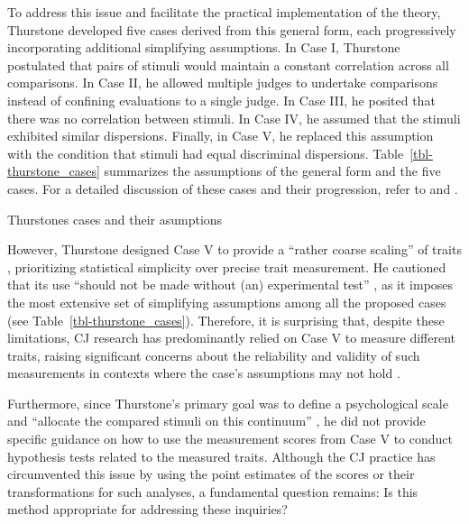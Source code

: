 \documentclass[
  authoryear,
  review,
  1p]{elsarticle}
\begin{document}
To address this issue and facilitate the practical implementation of the
theory, Thurstone developed five cases derived from this general form,
each progressively incorporating additional simplifying assumptions. In
Case I, Thurstone postulated that pairs of stimuli would maintain a
constant correlation across all comparisons. In Case II, he allowed
multiple judges to undertake comparisons instead of confining
evaluations to a single judge. In Case III, he posited that there was no
correlation between stimuli. In Case IV, he assumed that the stimuli
exhibited similar dispersions. Finally, in Case V, he replaced this
assumption with the condition that stimuli had equal discriminal
dispersions. Table~\ref{tbl-thurstone_cases} summarizes the assumptions
of the general form and the five cases. For a detailed discussion of
these cases and their progression, refer to \citet{Thurstone_1927b} and
\citet[pp.~248--253]{Bramley_2008}.

\begin{table}

\caption{\label{tbl-thurstone_cases}Thurstones cases and their
asumptions}


\end{table}%

However, Thurstone designed Case V to provide a ``rather coarse
scaling'' of traits \citep[pp.~269]{Thurstone_1927b}, prioritizing
statistical simplicity over precise trait measurement. He cautioned that
its use ``should not be made without (an) experimental test''
\citep[pp.~270]{Thurstone_1927b}, as it imposes the most extensive set
of simplifying assumptions among all the proposed cases
\citetext{\citealp[pp.~253]{Bramley_2008}; \citealp[pp.~677]{Kelly_et_al_2022}}
(see Table~\ref{tbl-thurstone_cases}). Therefore, it is surprising that,
despite these limitations, CJ research has predominantly relied on Case
V to measure different traits, raising significant concerns about the
reliability and validity of such measurements in contexts where the
case's assumptions may not hold \citep[pp.~677]{Kelly_et_al_2022}.

Furthermore, since Thurstone's primary goal was to define a
psychological scale and ``allocate the compared stimuli on this
continuum'' \citep[pp.~269]{Thurstone_1927b}, he did not provide
specific guidance on how to use the measurement scores from Case V to
conduct hypothesis tests related to the measured traits. Although the CJ
practice has circumvented this issue by using the point estimates of the
scores or their transformations for such analyses, a fundamental
question remains: Is this method appropriate for addressing these
inquiries?
\end{document}
